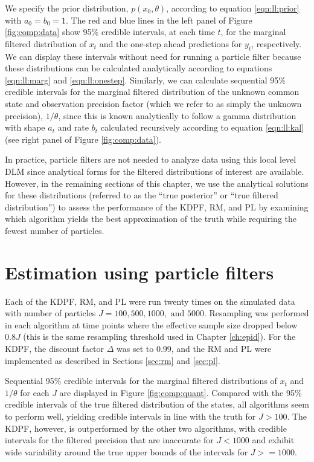 We specify the prior distribution, $p(x_0,\theta)$, according to equation \eqref{eqn:ll:prior} with $a_0 = b_0 = 1$. The red and blue lines in the left panel of Figure \ref{fig:comp:data} show 95\% credible intervals, at each time $t$, for the marginal filtered distribution of $x_t$ and the one-step ahead predictions for $y_t$, respectively. We can display these intervals without need for running a particle filter because these distributions can be calculated analytically according to equations \eqref{eqn:ll:marg} and \eqref{eqn:ll:onestep}. Similarly, we can calculate sequential 95\% credible intervals for the marginal filtered distribution of the unknown common state and observation precision factor (which we refer to as simply the unknown precision), $1/\theta$, since this is known analytically to follow a gamma distribution with shape $a_t$ and rate $b_t$ calculated recursively according to equation \eqref{eqn:ll:kal} (see right panel of Figure \ref{fig:comp:data}).

In practice, particle filters are not needed to analyze data using this local level DLM since analytical forms for the filtered distributions of interest are available. However, in the remaining sections of this chapter, we use the analytical solutions for these distributions (referred to as the ``true posterior'' or ``true filtered distribution'') to assess the performance of the KDPF, RM, and PL by examining which algorithm yields the best approximation of the truth while requiring the fewest number of particles.

\section{Estimation using particle filters} \label{sec:comp:est}

Each of the KDPF, RM, and PL were run twenty times on the simulated data with number of particles $J = 100, 500, 1000, \mbox{ and } 5000$. Resampling was performed in each algorithm at time points where the effective sample size dropped below $0.8J$ (this is the same resampling threshold used in Chapter \ref{ch:epid}). For the KDPF, the discount factor $\Delta$ was set to 0.99, and the RM and PL were implemented as described in Sections \ref{sec:rm} and \ref{sec:pl}.

Sequential 95\% credible intervals for the marginal filtered distributions of $x_t$ and $1/\theta$ for each $J$ are displayed in Figure \ref{fig:comp:quant}. Compared with the 95\% credible intervals of the true filtered distribution of the states, all algorithms seem to perform well, yielding credible intervals in line with the truth for $J > 100$. The KDPF, however, is outperformed by the other two algorithms, with credible intervals for the filtered precision that are inaccurate for $J < 1000$ and exhibit wide variability around the true upper bounds of the intervals for $J >= 1000$.

